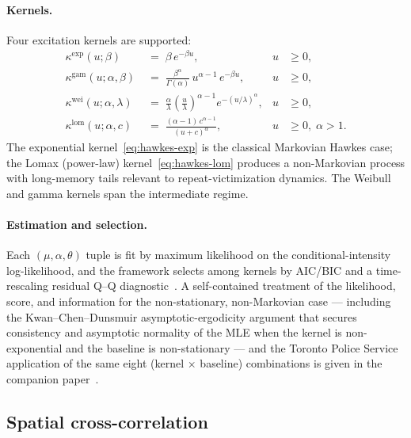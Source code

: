 \documentclass[11pt,a4paper]{article}
\theoremstyle{plain}
\theoremstyle{definition}
\theoremstyle{remark}
\begin{document}
\paragraph{Kernels.} Four excitation kernels are supported:
\begin{align}
  \kappa^{\mathrm{exp}}(u; \beta)
   &\;=\; \beta\, e^{-\beta u},
   & u &\ge 0,
   \label{eq:hawkes-exp} \\
  \kappa^{\mathrm{gam}}(u; \alpha, \beta)
   &\;=\; \frac{\beta^{\alpha}}{\Gamma(\alpha)}\, u^{\alpha - 1}\, e^{-\beta u},
   & u &\ge 0,
   \label{eq:hawkes-gam} \\
  \kappa^{\mathrm{wei}}(u; \alpha, \lambda)
   &\;=\; \frac{\alpha}{\lambda}\!\left(\frac{u}{\lambda}\right)^{\!\alpha-1}
       \!e^{-(u/\lambda)^{\alpha}},
   & u &\ge 0,
   \label{eq:hawkes-wei} \\
  \kappa^{\mathrm{lom}}(u; \alpha, c)
   &\;=\; \frac{(\alpha - 1)\,c^{\alpha - 1}}{(u + c)^{\alpha}},
   & u &\ge 0,\;\alpha > 1.
   \label{eq:hawkes-lom}
\end{align}
The exponential kernel~\eqref{eq:hawkes-exp} is the classical
Markovian Hawkes case; the Lomax (power-law)
kernel~\eqref{eq:hawkes-lom} produces a non-Markovian process
with long-memory tails relevant to repeat-victimization dynamics.
The Weibull and gamma kernels span the intermediate regime.

\paragraph{Estimation and selection.} Each
$(\mu, \alpha, \theta)$ tuple is fit by maximum likelihood on
the conditional-intensity log-likelihood, and the framework
selects among kernels by AIC/BIC and a time-rescaling residual
Q--Q diagnostic~\cite{Daley2003PointProcess}.  A self-contained
treatment of the likelihood, score, and information for the
non-stationary, non-Markovian case --- including the
Kwan--Chen--Dunsmuir asymptotic-ergodicity argument that secures
consistency and asymptotic normality of the MLE when the kernel
is non-exponential and the baseline is non-stationary --- and the
Toronto Police Service application of the same eight (kernel
$\times$ baseline) combinations is given in the companion
paper~\cite{Ruhela2026Hawkes}.

\subsection{Spatial cross-correlation}
\end{document}
